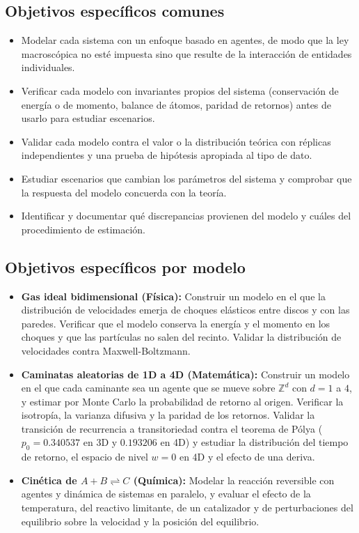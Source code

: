 \documentclass{article}
\begin{document}
\subsection{Objetivos específicos comunes}
\begin{itemize}
    \item Modelar cada sistema con un enfoque basado en agentes, de modo que la ley macroscópica no esté impuesta sino que resulte de la interacción de entidades individuales.
    \item Verificar cada modelo con invariantes propios del sistema (conservación de energía o de momento, balance de átomos, paridad de retornos) antes de usarlo para estudiar escenarios.
    \item Validar cada modelo contra el valor o la distribución teórica con réplicas independientes y una prueba de hipótesis apropiada al tipo de dato.
    \item Estudiar escenarios que cambian los parámetros del sistema y comprobar que la respuesta del modelo concuerda con la teoría.
    \item Identificar y documentar qué discrepancias provienen del modelo y cuáles del procedimiento de estimación.
\end{itemize}

\subsection{Objetivos específicos por modelo}
\begin{itemize}
    \item \textbf{Gas ideal bidimensional (Física):} Construir un modelo en el que la distribución de velocidades emerja de choques elásticos entre discos y con las paredes. Verificar que el modelo conserva la energía y el momento en los choques y que las partículas no salen del recinto. Validar la distribución de velocidades contra Maxwell-Boltzmann. 
    \item \textbf{Caminatas aleatorias de 1D a 4D (Matemática):} Construir un modelo en el que cada caminante sea un agente que se mueve sobre $\mathbb{Z}^d$ con $d=1$ a $4$, y estimar por Monte Carlo la probabilidad de retorno al origen. Verificar la isotropía, la varianza difusiva y la paridad de los retornos. Validar la transición de recurrencia a transitoriedad contra el teorema de Pólya ($p_0=0.340537$ en 3D y $0.193206$ en 4D) y estudiar la distribución del tiempo de retorno, el espacio de nivel $w=0$ en 4D y el efecto de una deriva.
    \item \textbf{Cinética de $A+B\rightleftharpoons C$ (Química):} Modelar la reacción reversible con agentes y dinámica de sistemas en paralelo, y evaluar el efecto de la temperatura, del reactivo limitante, de un catalizador y de perturbaciones del equilibrio sobre la velocidad y la posición del equilibrio.
\end{itemize}
\end{document}
